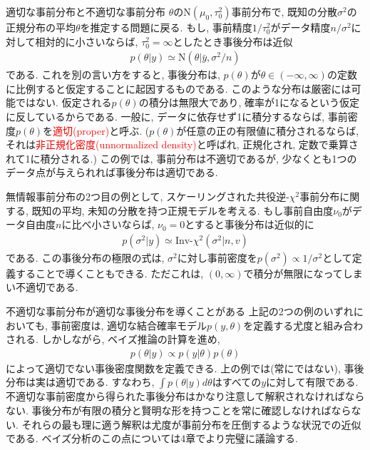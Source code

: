 \documentclass[10pt,dvipdfmx,a4]{beamer}
\newcommand{\eqn}[1]{\begin{align*}#1\end{align*}}
\newcommand{\tcr}[1]{\textcolor{red}{#1}}
\begin{document}

\begin{frame}{適切な事前分布と不適切な事前分布}
$\theta$の$\text{N}(\mu_0,\tau_0^2)$事前分布で, 既知の分散$\sigma^2$の正規分布の平均$\theta$を推定する問題に戻る.
もし, 事前精度$1/\tau_0^2$がデータ精度$n/\sigma^2$に対して相対的に小さいならば, $\tau_0^2=\infty$としたとき事後分布は近似
\eqn{p(\theta|y)\simeq\text{N}(\theta|\bar{y},\sigma^2/n)}
である.
これを別の言い方をすると, 事後分布は, $p(\theta)$が$\theta\in(-\infty, \infty)$の定数に比例すると仮定することに起因するものである.
このような分布は厳密には可能ではない.
仮定される$p(\theta)$の積分は無限大であり, 確率が1になるという仮定に反しているからである.
一般に, データに依存せず1に積分するならば, 事前密度$p(\theta)$を\tcr{適切(proper)}と呼ぶ.
($p(\theta)$が任意の正の有限値に積分されるならば, それは\tcr{非正規化密度(unnormalized density)}と呼ばれ, 正規化され, 定数で乗算されて1に積分される.)
この例では, 事前分布は不適切であるが, 少なくとも1つのデータ点が与えられれば事後分布は適切である.
\end{frame}


\begin{frame}
無情報事前分布の2つ目の例として, スケーリングされた共役逆-$\chi^2$事前分布に関する, 既知の平均, 未知の分散を持つ正規モデルを考える. 
もし事前自由度$\nu_0$がデータ自由度$n$に比べ小さいならば, $\nu_0=0$とすると事後分布は近似的に
\eqn{p(\sigma^2|y)\simeq \text{Inv-}\chi^2(\sigma^2|n,v)}
である.
この事後分布の極限の式は, $\sigma^2$に対し事前密度を$p(\sigma^2)\propto 1/\sigma^2$として定義することで導くこともできる.
ただこれは, $(0,\infty)$で積分が無限になってしまい不適切である.
\end{frame}


\begin{frame}{不適切な事前分布が適切な事後分布を導くことがある}
上記の2つの例のいずれにおいても, 事前密度は, 適切な結合確率モデル$p(y,\theta)$を定義する尤度と組み合わされる.
しかしながら, ベイズ推論の計算を進め,
\eqn{p(\theta|y)\propto p(y|\theta)p(\theta)}
によって適切でない事後密度関数を定義できる.
上の例では(常にではない), 事後分布は実は適切である.
すなわち, $\int p(\theta|y)d\theta$はすべての$y$に対して有限である.
不適切な事前密度から得られた事後分布はかなり注意して解釈されなければならない.
事後分布が有限の積分と賢明な形を持つことを常に確認しなければならない.
それらの最も理に適う解釈は尤度が事前分布を圧倒するような状況での近似である.
ベイズ分析のこの点については4章でより完璧に議論する.
\end{frame}
\end{document}
